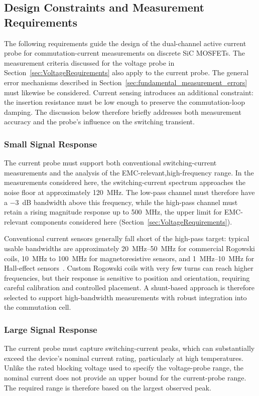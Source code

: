 
\subsection{Design Constraints and Measurement Requirements}
\label{sec:CurrentRequirements}

The following requirements guide the design of the dual-channel active current probe for commutation-current measurements on discrete SiC MOSFETs.
The measurement criteria discussed for the voltage probe in Section~\ref{sec:VoltageRequirements} also apply to the current probe.
The general error mechanisms described in Section~\ref{sec:fundamental_measurement_errors} must likewise be considered.
Current sensing introduces an additional constraint: the insertion resistance must be low enough to preserve the commutation-loop damping.
The discussion below therefore briefly addresses both measurement accuracy and the probe's influence on the switching transient.

\subsubsection*{Small Signal Response}
The current probe must support both conventional switching-current measurements and the analysis of the EMC-relevant,high-frequency range.
In the measurements considered here, the switching-current spectrum approaches the noise floor at approximately \SI{120}{MHz}.
The low-pass channel must therefore have a \SI{-3}{dB} bandwidth above this frequency, while the high-pass channel must retain a rising magnitude response up to \SI{500}{MHz}, the upper limit for EMC-relevant components considered here (Section~\ref{sec:VoltageRequirements}).

Conventional current sensors generally fall short of the high-pass target: typical usable bandwidths are approximately \SIrange{20}{50}{MHz} for commercial Rogowski coils, \SI{10}{MHz} to \SI{100}{MHz} for magnetoresistive sensors, and \SIrange{1}{10}{MHz} for Hall-effect sensors~\cite{xin_review_2022}.
Custom Rogowski coils with very few turns can reach higher frequencies, but their response is sensitive to position and orientation, requiring careful calibration and controlled placement.
A shunt-based approach is therefore selected to support high-bandwidth measurements with robust integration into the commutation cell.

\subsubsection*{Large Signal Response}
The current probe must capture switching-current peaks, which can substantially exceed the device's nominal current rating, particularly at high temperatures.
Unlike the rated blocking voltage used to specify the voltage-probe range, the nominal current does not provide an upper bound for the current-probe range.
The required range is therefore based on the largest observed peak.

